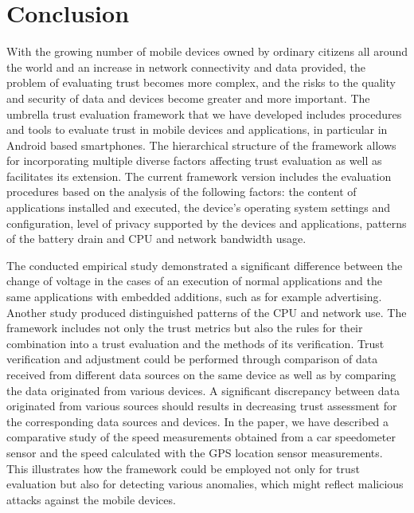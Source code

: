 \section{Conclusion}
With the growing number of mobile devices owned by ordinary citizens all around the world and an increase 
in network connectivity and data provided, the problem of evaluating trust becomes 
more complex, and the risks to
the quality and security of data and devices become greater and more important. The 
umbrella trust evaluation 
framework that we have developed includes procedures and tools to evaluate trust in mobile devices and applications, in particular in Android based smartphones. 
The  hierarchical structure of the framework allows for incorporating multiple diverse factors affecting trust evaluation as well as facilitates its extension.
The current framework version includes the evaluation procedures based on the analysis of the following factors: the content of applications installed and executed, the device’s operating system settings and configuration, level of privacy supported by the devices and applications, patterns of the battery drain and CPU and network bandwidth usage. 

The conducted empirical study demonstrated a significant difference between the change of voltage in the cases of an execution of normal applications and the same applications with embedded additions, such as for example advertising. Another study produced distinguished patterns of the CPU and network use.
The framework includes not only the trust metrics but also the rules for their combination into a trust
evaluation and the methods of its verification. 
Trust verification and adjustment could be performed through comparison of data received from different data sources on the 
same device as well as by comparing the data originated from various devices. A significant discrepancy between data 
originated from various sources should results in decreasing trust assessment for the corresponding data sources and devices. 
In the paper, we have described a comparative study of the speed measurements obtained from a car speedometer sensor 
and the speed calculated 
with the GPS location sensor measurements. This illustrates how the framework could be employed not only for trust evaluation 
but also for detecting various anomalies, which might reflect malicious attacks against the mobile devices.

